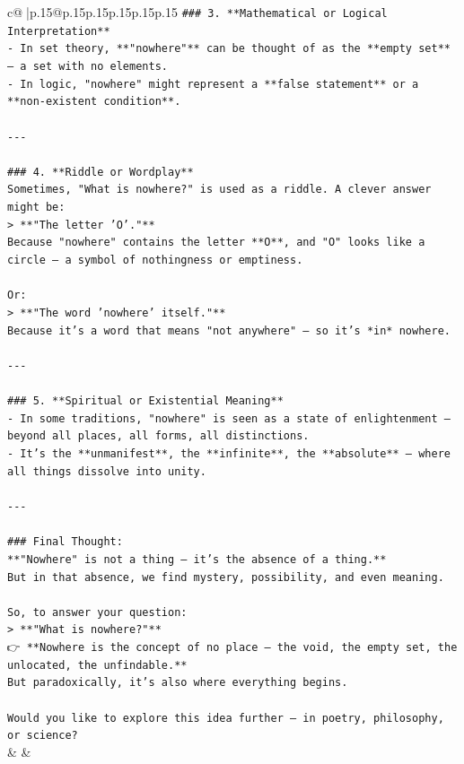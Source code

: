 \documentclass{article}
\begin{document}
{\begin{supertabular}{c@{$\;$}|p{.15\linewidth}@{}p{.15\linewidth}p{.15\linewidth}p{.15\linewidth}p{.15\linewidth}p{.15\linewidth}}
{{{\texttt{\#\#\# 3. **Mathematical or Logical Interpretation**} \\
\texttt{{-} In set theory, **"nowhere"** can be thought of as the **empty set** — a set with no elements.} \\
\texttt{{-} In logic, "nowhere" might represent a **false statement** or a **non{-}existent condition**.} \\
\\ 
\texttt{{-}{-}{-}} \\
\\ 
\texttt{\#\#\# 4. **Riddle or Wordplay**} \\
\texttt{Sometimes, "What is nowhere?" is used as a riddle. A clever answer might be:} \\
\texttt{> **"The letter 'O'."**  } \\
\texttt{Because "nowhere" contains the letter **O**, and "O" looks like a circle — a symbol of nothingness or emptiness.} \\
\\ 
\texttt{Or:} \\
\texttt{> **"The word 'nowhere' itself."**  } \\
\texttt{Because it’s a word that means "not anywhere" — so it’s *in* nowhere.} \\
\\ 
\texttt{{-}{-}{-}} \\
\\ 
\texttt{\#\#\# 5. **Spiritual or Existential Meaning**} \\
\texttt{{-} In some traditions, "nowhere" is seen as a state of enlightenment — beyond all places, all forms, all distinctions.} \\
\texttt{{-} It’s the **unmanifest**, the **infinite**, the **absolute** — where all things dissolve into unity.} \\
\\ 
\texttt{{-}{-}{-}} \\
\\ 
\texttt{\#\#\# Final Thought:} \\
\texttt{**"Nowhere" is not a thing — it’s the absence of a thing.**  } \\
\texttt{But in that absence, we find mystery, possibility, and even meaning.} \\
\\ 
\texttt{So, to answer your question:  } \\
\texttt{> **"What is nowhere?"**  } \\
\texttt{👉 **Nowhere is the concept of no place — the void, the empty set, the unlocated, the unfindable.**  } \\
\texttt{But paradoxically, it’s also where everything begins.} \\
\\ 
\texttt{Would you like to explore this idea further — in poetry, philosophy, or science?} \\
            }
        }
    }
    & & \\ \\


\end{supertabular}}
\end{document}
